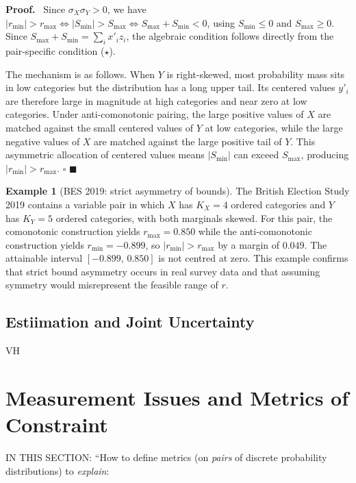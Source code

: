 \documentclass[
  12pt,
]{article}
\theoremstyle{plain}
\theoremstyle{definition}
\newtheorem{example}{Example}
\renewenvironment{proof}
   {\par\noindent\textbf{Proof.}\ }
   {\hfill$\blacksquare$\par}
\theoremstyle{remark}
\begin{document}
\begin{proof}
Since \(\sigma_X \sigma_Y > 0\), we have
\(|r_{\min}| > r_{\max} \iff |S_{\min}| > S_{\max} \iff S_{\max} + S_{\min} < 0\),
using \(S_{\min} \leq 0\) and \(S_{\max} \geq 0\). Since
\(S_{\max} + S_{\min} = \sum_i x'_i z_i\), the algebraic condition
follows directly from the pair-specific condition (\(\star\)).

The mechanism is as follows. When \(Y\) is right-skewed, most
probability mass sits in low categories but the distribution has a long
upper tail. Its centered values \(y'_i\) are therefore large in
magnitude at high categories and near zero at low categories. Under
anti-comonotonic pairing, the large positive values of \(X\) are matched
against the small centered values of \(Y\) at low categories, while the
large negative values of \(X\) are matched against the large positive
tail of \(Y\). This asymmetric allocation of centered values means
\(|S_{\min}|\) can exceed \(S_{\max}\), producing
\(|r_{\min}| > r_{\max}\). \(\square\)
\end{proof}

\begin{example}[BES 2019: strict asymmetry of bounds]
The British Election Study 2019 contains a variable pair in which $X$ has $K_X = 4$ ordered categories and $Y$ has $K_Y = 5$ ordered categories, with both marginals skewed.
For this pair, the comonotonic construction yields $r_{\max} = 0.850$ while the anti-comonotonic construction yields $r_{\min} = -0.899$, so $|r_{\min}| > r_{\max}$ by a margin of $0.049$.
The attainable interval $[-0.899,\, 0.850]$ is not centred at zero.
This example confirms that strict bound asymmetry occurs in real survey data and that assuming symmetry would misrepresent the feasible range of $r$.
\end{example}

\subsection{Estiimation and Joint
Uncertainty}\label{estiimation-and-joint-uncertainty}

VH

\section{Measurement Issues and Metrics of
Constraint}\label{sec-metrics}

IN THIS SECTION: ``How to define metrics (on \emph{pairs} of discrete
probability distributions) to \emph{explain}:
\end{document}
